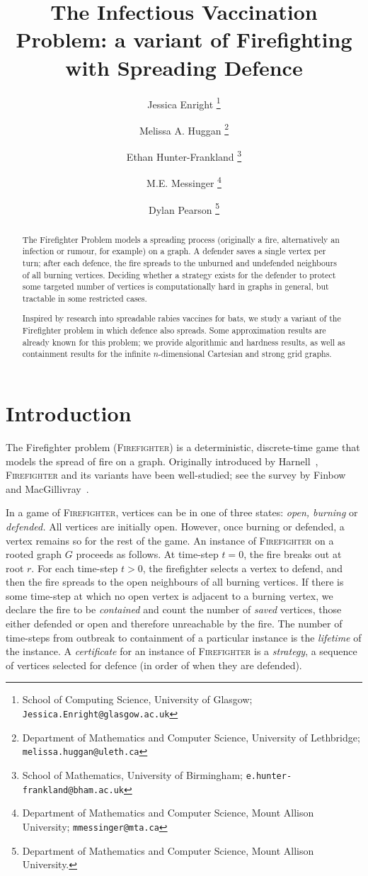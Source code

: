 \documentclass[unknownkeysallowed]{article}
\title{The Infectious Vaccination Problem: a variant of Firefighting with Spreading Defence}
\author{
Jessica Enright
   \thanks{School of Computing Science, University of Glasgow;
   \texttt{Jessica.Enright@glasgow.ac.uk}
   }
\and Melissa A. Huggan
   \thanks{Department of Mathematics and Computer Science, University of Lethbridge;
   \texttt{melissa.huggan@uleth.ca} 
   }
\and Ethan Hunter-Frankland
   \thanks{School of Mathematics, University of Birmingham;
  \texttt{e.hunter-frankland@bham.ac.uk}
   }
\and M.E. Messinger
   \thanks{Department of Mathematics and Computer Science, Mount Allison University;
   \texttt{mmessinger@mta.ca}
   }
\and Dylan Pearson
  \thanks{Department of Mathematics and Computer Science, Mount Allison University.
   }
}
\date{}
\theoremstyle{definition}\newtheorem{strategy}{Strategy}
\theoremstyle{definition}\newtheorem{notation}{Notation}[theorem]
\newcommand*{\Fire}{\textup{\textsc{Firefighter}}\xspace} %
\begin{document}
\maketitle



\begin{abstract}
The Firefighter Problem models a spreading process (originally a fire, alternatively an infection or rumour, for example) on a graph. A defender saves a single vertex per turn; after each defence, the fire spreads to the unburned and undefended neighbours of all burning vertices. Deciding whether a strategy exists for the defender to protect some targeted number of vertices is computationally hard in graphs in general, but tractable in some restricted cases. 

Inspired by research into spreadable rabies vaccines for bats, we study a variant of the Firefighter problem in which defence also spreads. Some approximation results are already known for this problem; we provide algorithmic and hardness results, as well as containment results for the infinite $n$-dimensional Cartesian and strong grid graphs.
\end{abstract}


\section{Introduction}\label{sec:background}

The Firefighter problem (\Fire) is a deterministic, discrete-time game that models the spread of fire on a graph.  Originally introduced by Harnell~\cite{hartnell_1995}, \Fire and its variants have been well-studied; see the survey by Finbow and MacGillivray~\cite{finbow_2009}.

In a game of \Fire, vertices can be in one of three states: \emph{open, burning} or \emph{defended.} All vertices are initially open. However, once burning or defended, a vertex remains so for the rest of the game. 
An instance of \Fire on a rooted graph $G$ proceeds as follows. At time-step $t=0$, the fire breaks out at root $r$. For each time-step $t>0$, the firefighter selects a vertex to defend, and then the fire spreads to the open neighbours of all burning vertices. If there is some time-step at which no open vertex is adjacent to a burning vertex, we declare the fire to be \emph{contained} and count the number of \emph{saved} vertices, those either defended or open and therefore unreachable by the fire. The number of time-steps from outbreak to containment of a particular instance is the \emph{lifetime} of the instance.  A \emph{certificate} for an instance of \Fire is a \emph{strategy}, a sequence of vertices selected for defence (in order of when they are defended).
\end{document}
